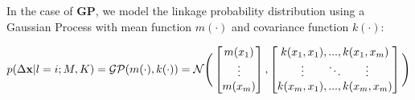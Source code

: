 \documentclass[12pt,PhD,twoside]{muthesis}
\begin{document}




In the case of \textbf{GP}, we model the linkage probability distribution using a Gaussian Process with mean function $m(\cdot)$ and covariance function $k(\cdot)$:  


\begin{equation}
\label{eq:gp}
p(\Delta \textbf x | l=i; M, K) = \mathcal{GP}(m(\cdot), k(\cdot)) = \mathcal{N}\Bigg( \begin{bmatrix}m(x_1) \\ \vdots \\ m(x_m) \end{bmatrix},  \begin{bmatrix}k(x_1, x_1), ..., k(x_1, x_m) \\ \vdots \quad \quad \ddots \quad \quad \vdots \\ k(x_m, x_1), ..., k(x_m, x_m)\end{bmatrix}  \Bigg)
\end{equation}
\end{document}
